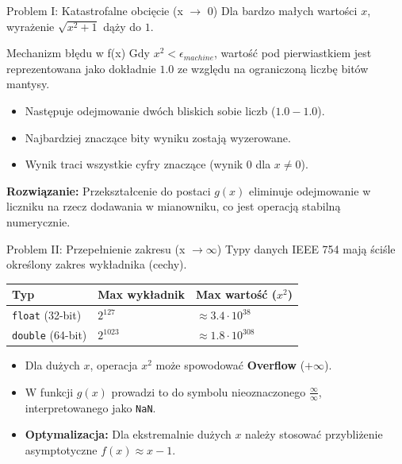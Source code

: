 \documentclass[10pt]{beamer}
\begin{document}
\begin{frame}{Problem I: Katastrofalne obcięcie (x $\to$ 0)}
    Dla bardzo małych wartości $x$, wyrażenie $\sqrt{x^2+1}$ dąży do $1$.
    \begin{block}{Mechanizm błędu w f(x)}
        Gdy $x^2 < \epsilon_{machine}$, wartość pod pierwiastkiem jest reprezentowana jako dokładnie $1.0$ ze względu na ograniczoną liczbę bitów mantysy.
        \begin{itemize}
            \item Następuje odejmowanie dwóch bliskich sobie liczb ($1.0 - 1.0$).
            \item Najbardziej znaczące bity wyniku zostają wyzerowane.
            \item Wynik traci wszystkie cyfry znaczące (wynik 0 dla $x \neq 0$).
        \end{itemize}
    \end{block}
    \textbf{Rozwiązanie:} Przekształcenie do postaci $g(x)$ eliminuje odejmowanie w liczniku na rzecz dodawania w mianowniku, co jest operacją stabilną numerycznie.
\end{frame}

\begin{frame}{Problem II: Przepełnienie zakresu (x $\to \infty$)}
    Typy danych IEEE 754 mają ściśle określony zakres wykładnika (cechy).
    \begin{table}[]
        \centering
        \begin{tabular}{@{}lll@{}}
            \toprule
            Typ & Max wykładnik & Max wartość ($x^2$) \\ \midrule
            \texttt{float} (32-bit) & $2^{127}$ & $\approx 3.4 \cdot 10^{38}$ \\
            \texttt{double} (64-bit) & $2^{1023}$ & $\approx 1.8 \cdot 10^{308}$ \\ \bottomrule
        \end{tabular}
    \end{table}
    \begin{itemize}
        \item Dla dużych $x$, operacja $x^2$ może spowodować \textbf{Overflow} ($+\infty$).
        \item W funkcji $g(x)$ prowadzi to do symbolu nieoznaczonego $\frac{\infty}{\infty}$, interpretowanego jako \texttt{NaN}.
        \item \textbf{Optymalizacja:} Dla ekstremalnie dużych $x$ należy stosować przybliżenie asymptotyczne $f(x) \approx x - 1$.
    \end{itemize}
\end{frame}
\end{document}
